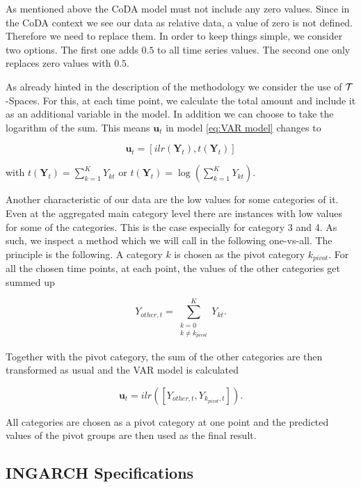 As mentioned above the CoDA model must not include any zero values. Since in the CoDA context we see our data as relative data, a value of zero is not defined. Therefore we need to replace them. In order to keep things simple, we consider two options. The first one adds $0.5$ to all time series values. The second one only replaces zero values with $0.5$.

As already hinted in the description of the methodology we consider the use of $\mathcal{T}$-Spaces. For this, at each time point, we calculate the total amount and include it as an additional variable in the model. In addition we can choose to take the logarithm of the sum. This means $\bm{u}_t$ in model \ref{eq:VAR model} changes to 

\begin{equation*}
\bm{u}_t = [ilr(\bm{Y}_t),t(\bm{Y}_t)]
\label{eq:Tspace u}
\end{equation*}

with $t(\bm{Y}_t) = \sum_{k=1}^K Y_{kt}$ or $t(\bm{Y}_t) = \log\left(\sum_{k=1}^K Y_{kt}\right)$.

Another characteristic of our data are the low values for some categories of it. Even at the aggregated main category level there are instances with low values for some of the categories. This is the case especially for category 3 and 4. As such, we inspect a method which we will call in the following one-vs-all. The principle is the following. A category $k$ is chosen as the pivot category $k_{pivot}$. For all the chosen time points, at each point, the values of the other categories get summed up

\begin{equation*}
Y_{other,t} = \sum_{\substack{k=0 \\ k \neq k_{pivot}}}^K Y_{kt}.
\label{eq:one vs all}
\end{equation*}

Together with the pivot category, the sum of the other categories are then transformed as usual and the VAR model is calculated 

\begin{equation*}
\bm{u}_t = ilr([Y_{other,t}, Y_{k_{pivot},t}]).
\label{eq:one vs all ilr}
\end{equation*}


All categories are chosen as a pivot category at one point and the predicted values of the pivot groups are then used as the final result. 


\subsection{INGARCH Specifications}
\label{sec: Ingarch Specifications}


